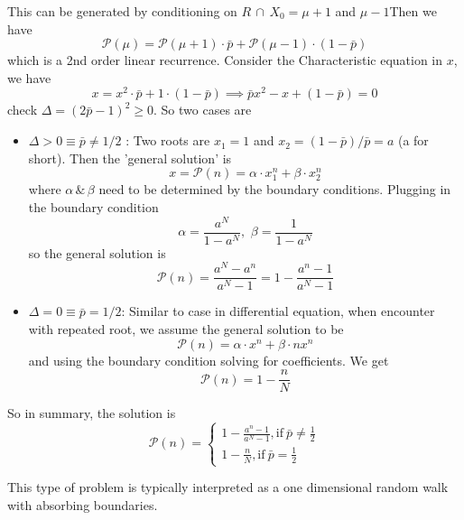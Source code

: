 \documentclass[10.5pt]{article}
\newcommand{\prob}[0]{\mathcal{P}}
\newenvironment{changemargin}[2]{%
  \begin{list}{}{%
    \setlength{\topsep}{0pt}%
    \setlength{\leftmargin}{#1}%
    \setlength{\rightmargin}{#2}%
    \setlength{\listparindent}{\parindent}%
    \setlength{\itemindent}{\parindent}%
    \setlength{\parsep}{\parskip}%
  }%
  \item[]}{\end{list}}
\begin{document}
\begin{changemargin}{-0.125in}{0in}
\begin{enumerate}
    This can be generated by conditioning on $R \,\cap\, X_0 = \mu + 1$ and $\mu - 1$Then we have 
    \[
    \prob(\mu) = \prob(\mu+1)\cdot \bar{p} + \prob(\mu-1)\cdot (1 - \bar{p})
    \]
    which is a 2nd order linear recurrence. Consider the Characteristic equation in $x$, we have 
    \[
    x = x^2 \cdot \bar{p} + 1 \cdot (1 - \bar{p}) \implies \bar{p}x^2 -x + (1 - \bar{p}) = 0
    \]
    check $\Delta = (2 \bar{p} - 1)^2 \geq 0$. So two cases are 
    
    \medskip
    
    \begin{itemize}
    	\item $\Delta > 0 \equiv \bar{p} \neq 1/2$ : Two roots are $x_1 = 1$ and $x_2 = (1 - \bar{p})/\bar{p} = a$ (a for short). Then the 'general solution' is 
    	 \[
    	 x = \prob(n) = \alpha\cdot x_1^n + \beta \cdot x_2^n
    	 \]
    	 where $\alpha\,\&\,\beta$ need to be determined by the boundary conditions. Plugging in the boundary condition 
    	 \[
    	 \alpha = \frac{a^N}{1 - a^N},\,\,\beta = \frac{1}{1 - a^N}
    	 \]
    	 so the general solution is 
    	 \[
    	 \prob(n) = \frac{a^N - a^n}{a^N - 1} = 1 - \frac{a^n - 1}{a^N -1}
    	 \]
    	 \item $\Delta = 0 \equiv \bar{p} = 1/2$: Similar to case in differential equation, when encounter with repeated root, we assume the general solution to be 
    	 \[
    	 \prob(n) = \alpha \cdot x^n + \beta\cdot n x^n
    	 \]
    	 and using the boundary condition solving for coefficients. We get 
    	 \[
    	 \prob(n) = 1 - \frac{n}{N}
    	 \]
    	 
    \end{itemize}
    So in summary, the solution is 
      \begin{equation}
      	\prob(n) = \begin{cases}
      		       1 - \frac{a^n - 1}{a^N -1}, \text{if}\ \bar{p} \neq \frac{1}{2}\\
      		         1 - \frac{n}{N}, \text{if}\ \bar{p} = \frac{1}{2}
      	           \end{cases}
      \end{equation}
      
      \begin{remark}
      	This type of problem is typically interpreted as a one dimensional random walk with absorbing boundaries. 
      \end{remark}
      
      \medskip
      

\end{enumerate}
\end{changemargin}
\end{document}
